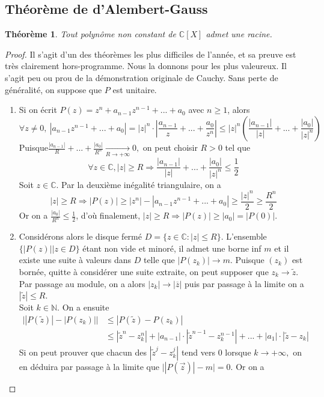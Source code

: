 \documentclass[french]{book}
\theoremstyle{plain}
\newtheorem{thm}{Théorème}[chapter]
\theoremstyle{definition}
\theoremstyle{remark}
\begin{document}
\subsection{Théorème de d'Alembert-Gauss}
\begin{thm}
	Tout polynôme non constant de $\mathbb{C}[X]$ admet une racine.
\end{thm}
\begin{proof} Il s'agit d'un des théorèmes les plus difficiles de l'année, et sa preuve est très clairement hors-programme. Nous la donnons pour les plus valeureux. Il s'agit peu ou prou de la démonstration originale de Cauchy. Sans perte de généralité, on suppose que $P$ est unitaire.
\begin{enumerate}
	\item Si on écrit $P(z)=z^{n}+a_{n-1}z^{n-1}+...+a_{0}$ avec $n\geqslant1$, alors
	$$\forall z\neq0,\ |a_{n-1}z^{n-1}+...+a_{0}|=|z|^{n}\cdot\left\lvert\frac{a_{n-1}}{z}+...+\frac{a_{0}}{z^{n}}\right\rvert\leq|z|^{n}(\frac{|a_{n-1}|}{|z|}+...+\frac{|a_{0}|}{|z|^{n}})$$
	Puisque$\displaystyle\frac{|a_{n-1}|}{R}+...+\frac{|a_{0}|}{R^{n}}\underset{R\rightarrow+\infty}{\longrightarrow}0,$
	on peut choisir $R>0$ tel que
	$$\forall z\in\mathbb{C},|z|\geqslant R\Rightarrow\frac{|a_{n-1}|}{|z|}+...+\frac{|a_{0}|}{|z|^{n}}\leq\frac{1}{2}$$
	Soit $z\in\mathbb{C}.$ Par la deuxième inégalité triangulaire, on a
	$$|z|\geqslant R\Rightarrow|P(z)|\geq|z^{n}|-|a_{n-1}z^{n-1}+...+a_{0}|\geq\frac{|z|^{n}}{2}\geq\frac{R^{n}}{2}$$
	Or on a $\displaystyle\frac{|a_{0}|}{R^{n}}\leq\frac{1}{2}$, d'où finalement, $|z|\geqslant R\Rightarrow|P(z)|\geq|a_{0}|=|P(0)|$.
	\item Considérons alors le disque fermé $D=\{z\in\mathbb{C}:|z|\leqslant R\}.$ L'ensemble $\{|P(z)||z\in D\}$ étant non vide et minoré, il admet une borne inf $m$ et il existe une suite à valeurs dans $D$ telle que $|P(z_{k})|\rightarrow m$. Puisque $(z_k)$ est bornée, quitte à considérer une suite extraite, on peut supposer que $z_{k}\rightarrow\tilde{z}.$ Par passage au module, on a alors $|z_{k}|\rightarrow|\overline{z}|$ puis par passage à la limite on a $|\tilde{z}|\leqslant R$. \\
	Soit $k\in\mathbb{N}.$ On a ensuite 
	\begin{align*}
		\big||P(\tilde{z})|-|P(z_{k})|\big| &\leq|P(\tilde{z})-P(z_{k})|\\
		&\leq|\tilde{z}^{n}-z_{k}^{n}|+|a_{n-1}|\cdot|\tilde{z}^{n-1}-z_{k}^{n-1}|+...+|a_{1}|\cdot|\tilde{z}-z_{k}|
	\end{align*}
	Si on peut prouver que chacun des $|\tilde{z}^{j}-z_{k}^{j}|$ tend vers 0 lorsque $k\rightarrow+\infty,$ on en déduira par passage à la limite que $\big||P(\vec{z})|-m\big|=0.$ Or on a

\end{enumerate}
\end{proof}
\end{document}
